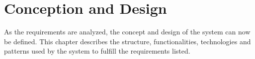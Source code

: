 \chapter{Conception and Design}

As the requirements are analyzed, the concept and design of the system can now be defined. This chapter describes the structure, functionalities, technologies and patterns used by the system to fulfill the requirements listed.




% 
